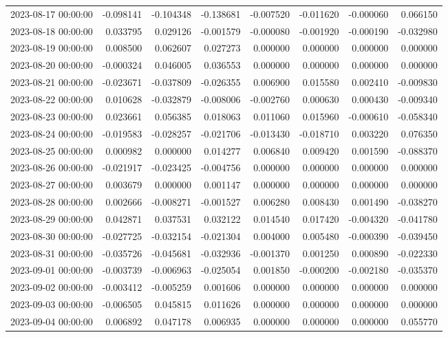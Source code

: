 \begin{tabular}{lrrrrrrr}
2023-08-17 00:00:00 & -0.098141 & -0.104348 & -0.138681 & -0.007520 & -0.011620 & -0.000060 & 0.066150 \\
2023-08-18 00:00:00 & 0.033795 & 0.029126 & -0.001579 & -0.000080 & -0.001920 & -0.000190 & -0.032980 \\
2023-08-19 00:00:00 & 0.008500 & 0.062607 & 0.027273 & 0.000000 & 0.000000 & 0.000000 & 0.000000 \\
2023-08-20 00:00:00 & -0.000324 & 0.046005 & 0.036553 & 0.000000 & 0.000000 & 0.000000 & 0.000000 \\
2023-08-21 00:00:00 & -0.023671 & -0.037809 & -0.026355 & 0.006900 & 0.015580 & 0.002410 & -0.009830 \\
2023-08-22 00:00:00 & 0.010628 & -0.032879 & -0.008006 & -0.002760 & 0.000630 & 0.000430 & -0.009340 \\
2023-08-23 00:00:00 & 0.023661 & 0.056385 & 0.018063 & 0.011060 & 0.015960 & -0.000610 & -0.058340 \\
2023-08-24 00:00:00 & -0.019583 & -0.028257 & -0.021706 & -0.013430 & -0.018710 & 0.003220 & 0.076350 \\
2023-08-25 00:00:00 & 0.000982 & 0.000000 & 0.014277 & 0.006840 & 0.009420 & 0.001590 & -0.088370 \\
2023-08-26 00:00:00 & -0.021917 & -0.023425 & -0.004756 & 0.000000 & 0.000000 & 0.000000 & 0.000000 \\
2023-08-27 00:00:00 & 0.003679 & 0.000000 & 0.001147 & 0.000000 & 0.000000 & 0.000000 & 0.000000 \\
2023-08-28 00:00:00 & 0.002666 & -0.008271 & -0.001527 & 0.006280 & 0.008430 & 0.001490 & -0.038270 \\
2023-08-29 00:00:00 & 0.042871 & 0.037531 & 0.032122 & 0.014540 & 0.017420 & -0.004320 & -0.041780 \\
2023-08-30 00:00:00 & -0.027725 & -0.032154 & -0.021304 & 0.004000 & 0.005480 & -0.000390 & -0.039450 \\
2023-08-31 00:00:00 & -0.035726 & -0.045681 & -0.032936 & -0.001370 & 0.001250 & 0.000890 & -0.022330 \\
2023-09-01 00:00:00 & -0.003739 & -0.006963 & -0.025054 & 0.001850 & -0.000200 & -0.002180 & -0.035370 \\
2023-09-02 00:00:00 & -0.003412 & -0.005259 & 0.001606 & 0.000000 & 0.000000 & 0.000000 & 0.000000 \\
2023-09-03 00:00:00 & -0.006505 & 0.045815 & 0.011626 & 0.000000 & 0.000000 & 0.000000 & 0.000000 \\
2023-09-04 00:00:00 & 0.006892 & 0.047178 & 0.006935 & 0.000000 & 0.000000 & 0.000000 & 0.055770 \\

\end{tabular}
